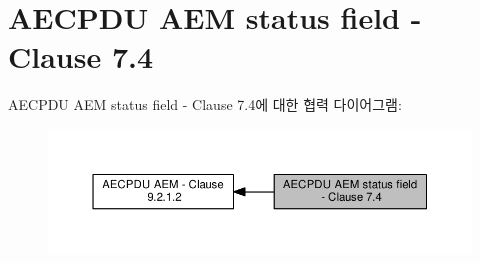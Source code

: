 \hypertarget{group__aecpdu__aem__status}{}\section{A\+E\+C\+P\+DU A\+EM status field -\/ Clause 7.4}
\label{group__aecpdu__aem__status}
A\+E\+C\+P\+DU A\+EM status field -\/ Clause 7.4에 대한 협력 다이어그램\+:
\nopagebreak
\begin{figure}[H]
\begin{center}
\leavevmode
\includegraphics[width=350pt]{group__aecpdu__aem__status}
\end{center}
\end{figure}
